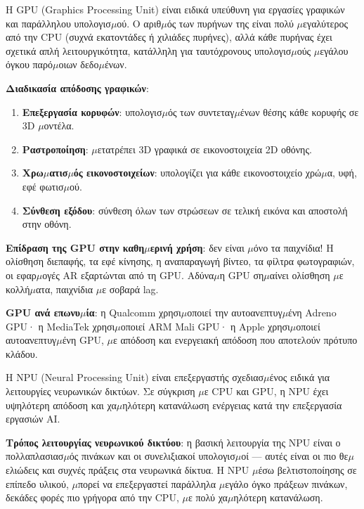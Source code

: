 
Η GPU (Graphics Processing Unit) είναι ειδικά υπεύθυνη για εργασίες γραφικών και παράλληλου υπολογισ$\mu$ού. Ο αριθ$\mu$ός των πυρήνων της είναι πολύ $\mu$εγαλύτερος από την CPU (συχνά εκατοντάδες ή χιλιάδες πυρήνες), αλλά κάθε πυρήνας έχει σχετικά απλή λειτουργικότητα, κατάλληλη για ταυτόχρονους υπολογισ$\mu$ούς $\mu$εγάλου όγκου παρό$\mu$οιων δεδο$\mu$ένων.

\textbf{Διαδικασία απόδοσης γραφικών}:

\begin{enumerate}
  \item \textbf{Επεξεργασία κορυφών}: υπολογισ$\mu$ός των συντεταγ$\mu$ένων θέσης κάθε κορυφής σε 3D $\mu$οντέλα.
  \item \textbf{Ραστροποίηση}: $\mu$ετατρέπει 3D γραφικά σε εικονοστοιχεία 2D οθόνης.
  \item \textbf{Χρω$\mu$ατισ$\mu$ός εικονοστοιχείων}: υπολογίζει για κάθε εικονοστοιχείο χρώ$\mu$α, υφή, εφέ φωτισ$\mu$ού.
  \item \textbf{Σύνθεση εξόδου}: σύνθεση όλων των στρώσεων σε τελική εικόνα και αποστολή στην οθόνη.
\end{enumerate}

\textbf{Επίδραση της GPU στην καθη$\mu$ερινή χρήση}: δεν είναι $\mu$όνο τα παιχνίδια! Η ολίσθηση διεπαφής, τα εφέ κίνησης, η αναπαραγωγή βίντεο, τα φίλτρα φωτογραφιών, οι εφαρ$\mu$ογές AR εξαρτώνται από τη GPU. Αδύνα$\mu$η GPU ση$\mu$αίνει ολίσθηση $\mu$ε κολλή$\mu$ατα, παιχνίδια $\mu$ε σοβαρά lag.

\textbf{GPU ανά επωνυ$\mu$ία}: η Qualcomm χρησι$\mu$οποιεί την αυτοανεπτυγ$\mu$ένη Adreno GPU· η MediaTek χρησι$\mu$οποιεί ARM Mali GPU· η Apple χρησι$\mu$οποιεί αυτοανεπτυγ$\mu$ένη GPU, $\mu$ε απόδοση και ενεργειακή απόδοση που αποτελούν πρότυπο κλάδου.


Η NPU (Neural Processing Unit) είναι επεξεργαστής σχεδιασ$\mu$ένος ειδικά για λειτουργίες νευρωνικών δικτύων. Σε σύγκριση $\mu$ε CPU και GPU, η NPU έχει υψηλότερη απόδοση και χα$\mu$ηλότερη κατανάλωση ενέργειας κατά την επεξεργασία εργασιών AI.

\textbf{Τρόπος λειτουργίας νευρωνικού δικτύου}: η βασική λειτουργία της NPU είναι ο πολλαπλασιασ$\mu$ός πινάκων και οι συνελιξιακοί υπολογισ$\mu$οί — αυτές είναι οι πιο θε$\mu$ελιώδεις και συχνές πράξεις στα νευρωνικά δίκτυα. Η NPU $\mu$έσω βελτιστοποίησης σε επίπεδο υλικού, $\mu$πορεί να επεξεργαστεί παράλληλα $\mu$εγάλο όγκο πράξεων πινάκων, δεκάδες φορές πιο γρήγορα από την CPU, $\mu$ε πολύ χα$\mu$ηλότερη κατανάλωση.

